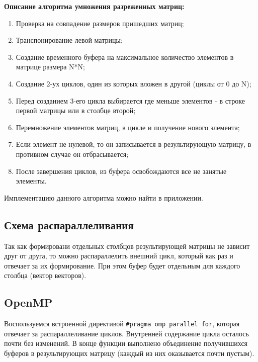\documentclass{report}
\begin{document}
\par \textbf{Описание алгоритма умножения разреженных матриц:}
\begin{enumerate} 
	\item Проверка на совпадение размеров пришедших матриц;
	\item Транспонирование левой матрицы;
	\item Создание временного буфера на максимальное количество элементов в матрице размера N*N;
	\item Создание 2-ух циклов, один из которых вложен в другой (циклы от 0 до N);
	\item Перед созданием 3-его цикла выбирается где меньше элементов - в строке первой матрицы или в столбце второй;
	\item Перемножение элементов матриц, в цикле и получение нового элемента;
	\item Если элемент не нулевой, то он записывается в результирующую матрицу, в противном случае он отбрасывается;
	\item После завершения циклов, из буфера освобождаются все не занятые элементы.
\end{enumerate} 

Имплементацию данного алгоритма можно найти в приложении.

\newpage

\begin{center}\section*{Схема распараллеливания}\end{center}
\par Так как формировани отдельных столбцов результирующей матрицы не зависит друг от друга, то можно распараллелить внешний цикл, который как раз и отвечает за их формирование. При этом буфер будет отдельным для каждого столбца (вектор векторов).
\subsection*{OpenMP}
\par Воспользуемся встроенной директивой \verb|#pragma omp parallel for|, которая отвечает за распараллеливание циклов. Внутренней содержание цикла осталось почти без изменений. В конце функции выполнено объединение получившихся буферов в результирующих матрицу (каждый из них оказывается почти пустым).
\end{document}
